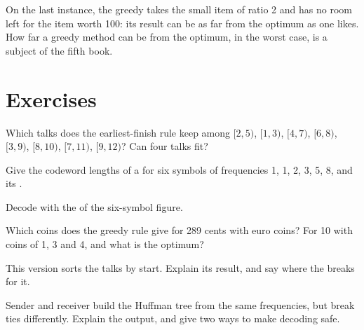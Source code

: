 On the last instance, the greedy takes the small item of ratio 2 and has no room left for the item worth 100: its result
can be as far from the optimum as one likes. How far a greedy method can be from the optimum, in the worst case, is a
subject of the fifth book.

\section{Exercises}\label{sec:b1:greedy-proofs:exercises}

\begin{exercise}[$\star$]\label{exo:b1:greedy-proofs:1}
Which talks does the earliest-finish rule keep among $[2, 5)$, $[1, 3)$, $[4, 7)$, $[6, 8)$, $[3, 9)$, $[8, 10)$, $[7, 11)$,
$[9, 12)$? Can four talks fit?
\end{exercise}

\begin{exercise}[$\star$]\label{exo:b1:greedy-proofs:2}
Give the codeword lengths of a  for six symbols of frequencies 1, 1, 2, 3, 5, 8, and its .
\end{exercise}

\begin{exercise}[$\star$]\label{exo:b1:greedy-proofs:3}
Decode  with the  of the six-symbol figure.
\end{exercise}

\begin{exercise}[$\star$]\label{exo:b1:greedy-proofs:4}
Which coins does the greedy rule give for 289 cents with euro coins? For 10 with coins of 1, 3 and 4, and what is the
optimum?
\end{exercise}

\begin{exercise}[$\star\star$]\label{exo:b1:greedy-proofs:5}
This version sorts the talks by start. Explain its result, and say where the  breaks for it.
\end{exercise}

\begin{exercise}[$\star\star$]\label{exo:b1:greedy-proofs:6}
Sender and receiver build the Huffman tree from the same frequencies, but break ties differently. Explain the output,
and give two ways to make decoding safe.
\end{exercise}

